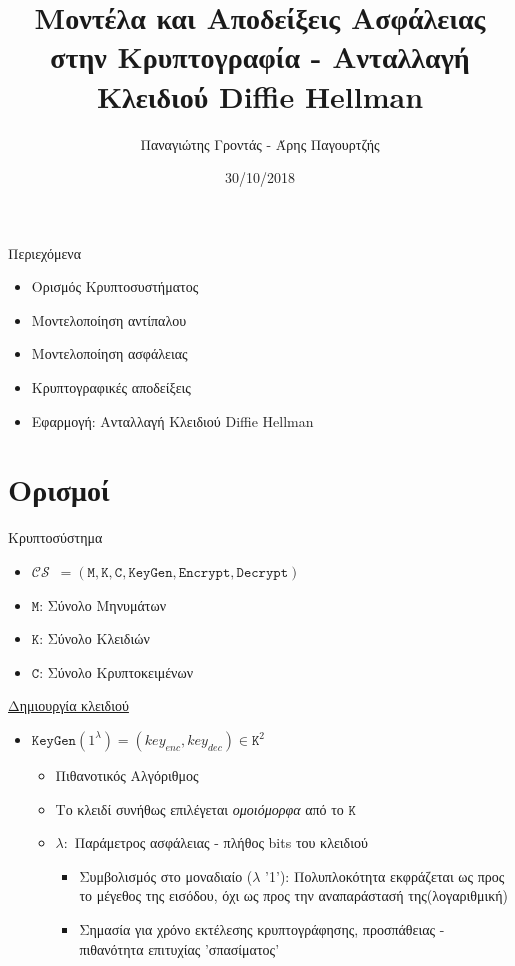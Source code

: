 \documentclass[handout]{beamer}
\title{Μοντέλα και Αποδείξεις Ασφάλειας στην Κρυπτογραφία - Ανταλλαγή Κλειδιού Diffie Hellman}
\author{Παναγιώτης Γροντάς - Άρης Παγουρτζής}
\date{30/10/2018}
\institute{ΕΜΠ - Κρυπτογραφία (2018-2019)}
\begin{document}
\newcommand{\MSG}{ \mathtt{M} }
\newcommand{\KEY}{ \mathtt{K} }
\newcommand{\CPH}{ \mathtt{C} }
\newcommand{\keygen}{\mathtt{KeyGen}}
\newcommand{\enc}{\mathtt{Encrypt}}
\newcommand{\dec}{\mathtt{Decrypt}}
\newcommand{\adv}{$\mathcal{A} \,$ }
\newcommand{\advb}{$\mathcal{B} \,$ }
\newcommand{\chal}{$\mathcal{C} \,$ }
\newcommand{\cs}{$\mathcal{CS} \,$ }
 

\newcommand{\twopartdef}[4]
{ 
		\begin{cases}
			#1 , #2 \\
			#3 , #4
		\end{cases} 
}
\begin{frame}
\titlepage
\end{frame}



\begin{frame}{Περιεχόμενα}
\begin{itemize}
\item Ορισμός Κρυπτοσυστήματος
\item Μοντελοποίηση αντίπαλου
\item Μοντελοποίηση ασφάλειας
\item Κρυπτογραφικές αποδείξεις
\item Εφαρμογή: Ανταλλαγή Κλειδιού Diffie Hellman
\end{itemize}
\end{frame}

\section{Ορισμοί}
\begin{frame}{Κρυπτοσύστημα}
\begin{itemize}
\item \cs$=(\MSG, \KEY, \CPH, \keygen, \enc, \dec)$ 
\item $\MSG$: Σύνολο Μηνυμάτων
\item $\KEY$: Σύνολο Κλειδιών
\item $\CPH$: Σύνολο Κρυπτοκειμένων \pause
\end{itemize}
\underline{Δημιουργία κλειδιού}
\begin{itemize}
\item $\keygen(1^\lambda) = (key_{enc},{key_{dec}}) \in \KEY^2$ 
\begin{itemize}
\item Πιθανοτικός Αλγόριθμος 
\item Το κλειδί συνήθως επιλέγεται \emph{ομοιόμορφα} από το $\KEY$ 
\item $\lambda:$ Παράμετρος ασφάλειας - πλήθος bits του κλειδιού \pause
\begin{itemize}
	\item Συμβολισμός στο μοναδιαίο ($\lambda$ '1'): Πολυπλοκότητα εκφράζεται ως προς το μέγεθος της εισόδου, όχι ως προς την αναπαράστασή της(λογαριθμική)
	\item Σημασία για χρόνο εκτέλεσης κρυπτογράφησης, προσπάθειας - πιθανότητα επιτυχίας 'σπασίματος'
\end{itemize}
\end{itemize}
\end{itemize}
\end{frame}
\end{document}
